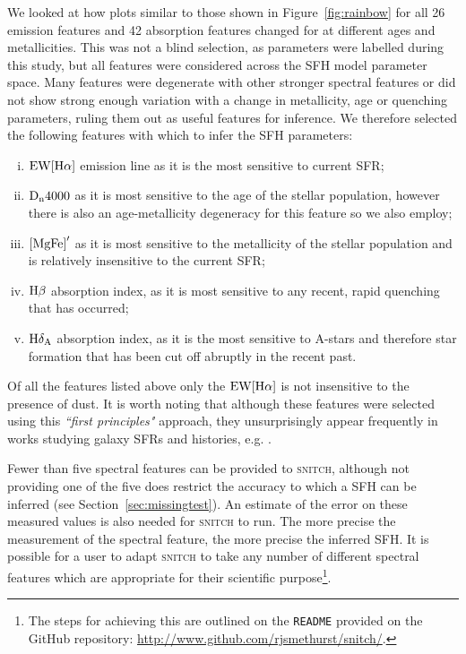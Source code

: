 \documentclass[useAMS,usenatbib]{mn2e}
\begin{document}
We looked at how plots similar to those shown in Figure~\ref{fig:rainbow} for all 26 emission features and 42 absorption features changed for at different ages and metallicities. This was not a blind selection, as parameters were labelled during this study, but all features were considered across the SFH model parameter space. Many features were degenerate with other stronger spectral features or did not show strong enough variation with a change in metallicity, age or quenching parameters, ruling them out as useful features for inference. We therefore selected the following features with which to infer the SFH parameters:
\begin{enumerate}[(i)]
\item $\rm{EW}[H\alpha]$ emission line as it is the most sensitive to current SFR;


\item $\rm{D}_n4000$ as it is most sensitive to the age of the stellar population, however there is also an age-metallicity degeneracy for this feature so we also employ;

\item $\rm{[MgFe]}^{\prime}$ as it is most sensitive to the metallicity of the stellar population and is relatively insensitive to the current SFR;

\item $\rm{H}\beta$ absorption index, as it is most sensitive to any recent, rapid quenching that has occurred;

\item $\rm{H}\delta_A$ absorption index, as it is the most sensitive to A-stars and therefore star formation that has been cut off abruptly in the recent past.


\end{enumerate}

Of all the features listed above only the $\rm{EW}[H\alpha]$ is not insensitive to the presence of dust. It is worth noting that although these features were selected using this \emph{``first principles"} approach, they unsurprisingly appear frequently in works studying galaxy SFRs and histories, e.g. \cite{kauffmann03}.

Fewer than five spectral features can be provided to \textsc{snitch}, although not providing one of the five does restrict the accuracy to which a SFH can be inferred (see Section~\ref{sec:missingtest}). An estimate of the error on these measured values is also needed for \textsc{snitch} to run. The more precise the measurement of the spectral feature, the more precise the inferred SFH. It is possible for a user to adapt \textsc{snitch} to take any number of different spectral features which are appropriate for their scientific purpose\footnote{The steps for achieving this are outlined on the \texttt{README} provided on the GitHub repository: \url{http://www.github.com/rjsmethurst/snitch/}.}.
\end{document}

